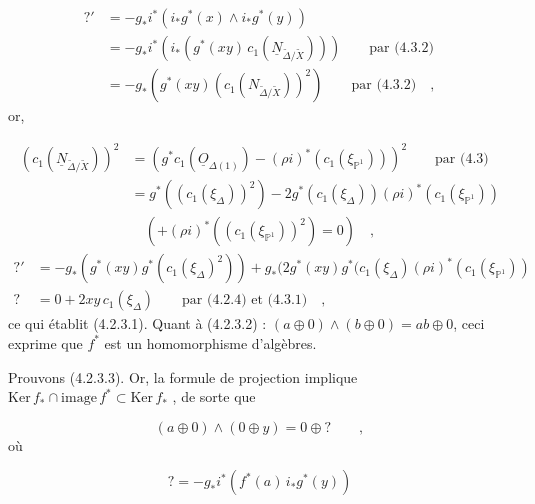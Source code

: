 
\begin{equation*}
\begin{aligned}
?' &= -g_*i^*(i_*g^*(x) \wedge i_*g^*(y)) \\
&= -g_*i^*(i_*(g^*(xy)\, c_1(\underline{N}_{\widetilde{\Delta}/\widetilde{X}}))) \qquad \text{par (4.3.2)} \\
&= -g_*(g^*(xy)(c_1(N_{\widetilde{\Delta}/\widetilde{X}}))^2) \qquad \text{par (4.3.2)} \quad ,
\end{aligned}
\end{equation*}
or,

\begin{equation*}
\begin{aligned}
(c_1(\underline{N}_{\widetilde{\Delta}/\widetilde{X}}))^2 &= (g^*c_1(\underline{O}_{\Delta(1)}) - (\rho i)^* (c_1(\xi_{\mathbb{P}^1})))^2 \qquad \text{par (4.3)} \\
&= g^*((c_1(\xi_\Delta))^2) - 2g^*(c_1(\xi_\Delta))(\rho i)^*(c_1(\xi_{\mathbb{P}^1})) \\
&\quad ( + (\rho i)^* ((c_1( \xi_{\mathbb{P}^1}))^2) = 0 ) \quad ,
\end{aligned}
\end{equation*}
\begin{equation*}
\begin{aligned}
?' &= - g_*(g^*(xy)g^*(c_1(\xi_\Delta)^2)) + g_*(2g^*(xy)g^*(c_1(\xi_\Delta)(\rho i)^*(c_1(\xi_{\mathbb{P}^1})) \\
? &= 0 + 2xy\, c_1(\xi_\Delta) \qquad \text{par (4.2.4) et (4.3.1)} \quad ,
\end{aligned}
\end{equation*}
ce qui établit (4.2.3.1). Quant à (4.2.3.2) : $(a \oplus 0) \wedge (b \oplus 0) = ab \oplus 0$, ceci exprime que $f^*$ est un homomorphisme d'algèbres.

Prouvons (4.2.3.3). Or, la formule de projection implique $\mathrm{Ker}\, f_* \cap \mathrm{image}\, f^* \subset \mathrm{Ker}\, f_*$ , de sorte que

\begin{equation*}
(a \oplus 0) \wedge (0 \oplus y) = 0 \oplus ? \qquad ,
\end{equation*}
où

\begin{equation}\tag{4.3.3}
? = - g_*i^*(f^*(a)\, i_*g^*(y)) 
\end{equation}


